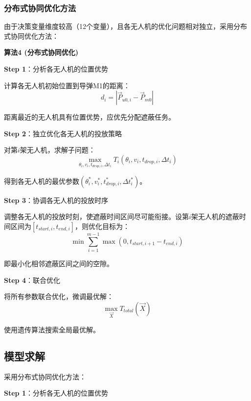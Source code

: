 \documentclass[12pt,a4paper]{article}
\begin{document}
\subsubsection{分布式协同优化方法}

\indent 由于决策变量维度较高（12个变量），且各无人机的优化问题相对独立，采用分布式协同优化方法：

\noindent\textbf{算法4 (分布式协同优化)}

\indent \textbf{Step 1}：分析各无人机的位置优势

\indent 计算各无人机初始位置到导弹M1的距离：
\begin{equation}
d_i = |\vec{P}_{u0,i} - \vec{P}_{m0}|
\end{equation}

\indent 距离最近的无人机具有位置优势，应优先分配遮蔽任务。

\indent \textbf{Step 2}：独立优化各无人机的投放策略

\indent 对第$i$架无人机，求解子问题：
\begin{equation}
\max_{\theta_i, v_i, t_{drop,i}, \Delta t_i} T_i(\theta_i, v_i, t_{drop,i}, \Delta t_i)
\end{equation}

\indent 得到各无人机的最优参数$(\theta_i^*, v_i^*, t_{drop,i}^*, \Delta t_i^*)$。

\indent \textbf{Step 3}：协调各无人机的投放时序

\indent 调整各无人机的投放时刻，使遮蔽时间区间尽可能衔接。设第$i$架无人机的遮蔽时间区间为$[t_{start,i}, t_{end,i}]$，则优化目标为：
\begin{equation}
\min \sum_{i=1}^{m-1} \max(0, t_{start,i+1} - t_{end,i})
\end{equation}

\indent 即最小化相邻遮蔽区间之间的空隙。

\indent \textbf{Step 4}：联合优化

\indent 将所有参数联合优化，微调最优解：
\begin{equation}
\max_{\vec{X}} T_{total}(\vec{X})
\end{equation}

\indent 使用遗传算法搜索全局最优解。

\subsection{模型求解}

\indent 采用分布式协同优化方法：

\noindent\textbf{Step 1}：分析各无人机的位置优势
\end{document}
